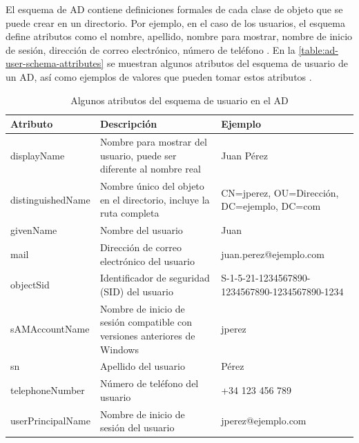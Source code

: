 El esquema de AD contiene definiciones formales de cada clase de objeto que se puede crear en un directorio. Por ejemplo, en el caso de los usuarios, el esquema define atributos como el nombre, apellido, nombre para mostrar, nombre de inicio de sesión, dirección de correo electrónico, número de teléfono \autocite{harrison_lightweight_2006,voglmaier_abcs_2003,howes_ldap_1997,shlipsey3_how_2024}. En la \autoref{table:ad-user-schema-attributes} se muestran algunos atributos del esquema de usuario de un AD, así como ejemplos de valores que pueden tomar estos atributos \autocite{derdus_user_2024}.

\begin{longtable}{|l|p{5cm}|p{5cm}|}
    \caption{Algunos atributos del esquema de usuario en el AD}
    \label{table:ad-user-schema-attributes}                                                                                                        \\
    \hline
    \textbf{Atributo} & \textbf{Descripción}                                                      & \textbf{Ejemplo}                               \\
    \hline
    \endfirsthead
    \hline
    displayName       & Nombre para mostrar del usuario, puede ser diferente al nombre real       & Juan Pérez                                     \\
    \hline
    distinguishedName & Nombre único del objeto en el directorio, incluye la ruta completa        & CN=jperez, OU=Dirección, DC=ejemplo, DC=com    \\
    \hline
    givenName         & Nombre del usuario                                                        & Juan                                           \\
    \hline
    mail              & Dirección de correo electrónico del usuario                               & juan.perez@ejemplo.com                         \\
    \hline
    objectSid         & Identificador de seguridad (SID) del usuario                              & S-1-5-21-1234567890-1234567890-1234567890-1234 \\
    \hline
    sAMAccountName    & Nombre de inicio de sesión compatible con versiones anteriores de Windows & jperez                                         \\
    \hline
    sn                & Apellido del usuario                                                      & Pérez                                          \\
    \hline
    telephoneNumber   & Número de teléfono del usuario                                            & +34 123 456 789                                \\
    \hline
    userPrincipalName & Nombre de inicio de sesión del usuario                                    & jperez@ejemplo.com                             \\
    \hline
\end{longtable}
